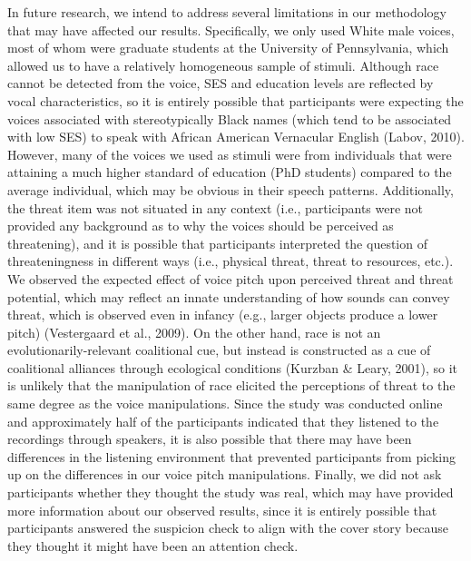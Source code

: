 \documentclass[
  english,
  man, noextraspace,floatsintext]{apa6}
\begin{document}
In future research, we intend to address several limitations in our methodology that may have affected our results. Specifically, we only used White male voices, most of whom were graduate students at the University of Pennsylvania, which allowed us to have a relatively homogeneous sample of stimuli. Although race cannot be detected from the voice, SES and education levels are reflected by vocal characteristics, so it is entirely possible that participants were expecting the voices associated with stereotypically Black names (which tend to be associated with low SES) to speak with African American Vernacular English (Labov, 2010). However, many of the voices we used as stimuli were from individuals that were attaining a much higher standard of education (PhD students) compared to the average individual, which may be obvious in their speech patterns. Additionally, the threat item was not situated in any context (i.e., participants were not provided any background as to why the voices should be perceived as threatening), and it is possible that participants interpreted the question of threateningness in different ways (i.e., physical threat, threat to resources, etc.). We observed the expected effect of voice pitch upon perceived threat and threat potential, which may reflect an innate understanding of how sounds can convey threat, which is observed even in infancy (e.g., larger objects produce a lower pitch) (Vestergaard et al., 2009). On the other hand, race is not an evolutionarily-relevant coalitional cue, but instead is constructed as a cue of coalitional alliances through ecological conditions (Kurzban \& Leary, 2001), so it is unlikely that the manipulation of race elicited the perceptions of threat to the same degree as the voice manipulations. Since the study was conducted online and approximately half of the participants indicated that they listened to the recordings through speakers, it is also possible that there may have been differences in the listening environment that prevented participants from picking up on the differences in our voice pitch manipulations. Finally, we did not ask participants whether they thought the study was real, which may have provided more information about our observed results, since it is entirely possible that participants answered the suspicion check to align with the cover story because they thought it might have been an attention check.
\end{document}
